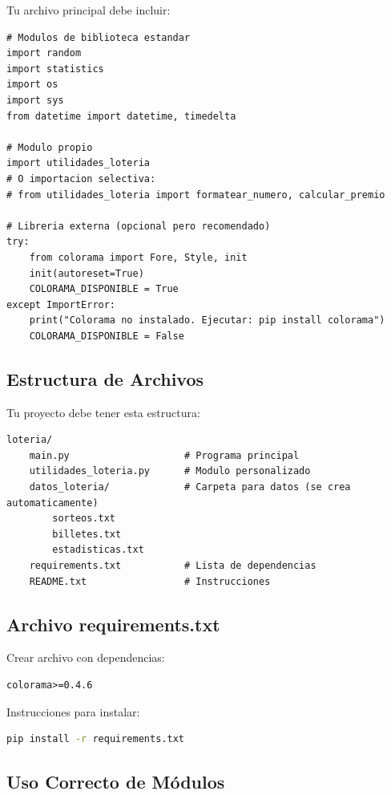\documentclass[12pt,a4paper]{article}
\begin{document}
Tu archivo principal debe incluir:

\begin{lstlisting}[caption=Importaciones del programa principal]
# Modulos de biblioteca estandar
import random
import statistics
import os
import sys
from datetime import datetime, timedelta

# Modulo propio
import utilidades_loteria
# O importacion selectiva:
# from utilidades_loteria import formatear_numero, calcular_premio

# Libreria externa (opcional pero recomendado)
try:
    from colorama import Fore, Style, init
    init(autoreset=True)
    COLORAMA_DISPONIBLE = True
except ImportError:
    print("Colorama no instalado. Ejecutar: pip install colorama")
    COLORAMA_DISPONIBLE = False
\end{lstlisting}

\subsection{Estructura de Archivos}

Tu proyecto debe tener esta estructura:

\begin{lstlisting}[caption=Estructura del proyecto]
loteria/
    main.py                    # Programa principal
    utilidades_loteria.py      # Modulo personalizado
    datos_loteria/             # Carpeta para datos (se crea automaticamente)
        sorteos.txt
        billetes.txt
        estadisticas.txt
    requirements.txt           # Lista de dependencias
    README.txt                 # Instrucciones
\end{lstlisting}

\subsection{Archivo requirements.txt}

Crear archivo con dependencias:

\begin{lstlisting}[caption=requirements.txt]
colorama>=0.4.6
\end{lstlisting}

Instrucciones para instalar:
\begin{lstlisting}[language=bash]
pip install -r requirements.txt
\end{lstlisting}

\subsection{Uso Correcto de Módulos}
\end{document}

